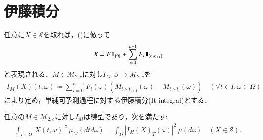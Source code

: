 \section{伊藤積分}
	
	\begin{screen}
		\begin{dfn}[単純可予測過程に対する伊藤積分]
			任意に$X \in \mathcal{S}$を取れば，()に倣って
			\begin{align}
				X = F \mbox{1}\hspace{-0.25em}\mbox{l}_{\{0\}} + \sum_{i=0}^{n-1} F_i \mbox{1}\hspace{-0.25em}\mbox{l}_{\left(t_i,t_{i+1}\right]}
				\label{eq:dfn_Ito_integral_simple_predictable_process}
			\end{align}
			と表現される．$M \in \mathcal{M}_{2,c}$に対し$I_M:\mathcal{S} \rightarrow \mathcal{M}_{2,c}$を
			\begin{align}
				I_M(X)(t,\omega) \coloneqq \sum_{i=0}^{n-1} F_i(\omega) \left(M_{t \wedge t_{i+1}}(\omega) - M_{t \wedge t_i}(\omega)\right)
				\quad (\forall t \in I,\omega \in \Omega)
			\end{align}
			により定め，単純可予測過程に対する伊藤積分(It integral)とする．
			\label{dfn:Ito_integral_simple_predictable_process}
		\end{dfn}
	\end{screen}
	
	\begin{screen}
		\begin{thm}[伊藤積分の線型等長性]
			任意の$M \in \mathcal{M}_{2,c}$に対し$I_M$は線型であり，次を満たす:
			\begin{align}
				\int_{I \times \Omega} \left| X(t,\omega) \right|^2\ \mu_M(dtd\omega)
				= \int_\Omega \left| I_M(X)_T(\omega) \right|^2\ \mu(d\omega)
				\quad (X \in \mathcal{S}).
				\label{eq:thm_Ito_integral_linearity_isometric}
			\end{align}
			\label{thm:Ito_integral_linearity_isometric}
		\end{thm}
	\end{screen}
	
